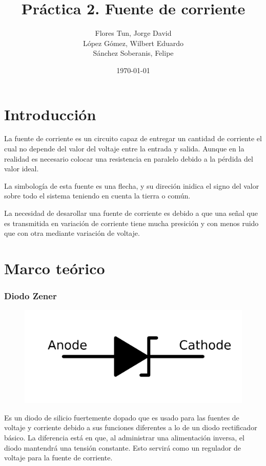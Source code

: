 \documentclass{article}
\title{Práctica 2. Fuente de corriente}
\author{Flores Tun, Jorge David\\ López Gómez, Wilbert Eduardo\\ Sánchez Soberanis, Felipe}
\date{\today}
\begin{document}
\maketitle

\tableofcontents

\section{Introducción}
La fuente de corriente es un circuito capaz de entregar un cantidad de corriente el cual no depende del valor del voltaje entre la entrada y salida. Aunque en la realidad es necesario colocar una resistencia en paralelo debido a la pérdida del valor ideal.

La simbología de esta fuente es una flecha, y su direción inidica el signo del valor sobre todo el sistema teniendo en cuenta la tierra o común.

La necesidad de desarollar una fuente de corriente es debido a que una señal que es transmitida en variación de corriente tiene mucha presición y con menos ruido que con otra mediante variación de voltaje.

\section{Marco teórico}
\subsubsection*{Diodo Zener}

\begin{figure}[h]
    \centering
    \includegraphics[scale=0.2]{1024px-Zener_diode_symbol.svg.png}    
\end{figure}


Es un diodo de silicio fuertemente dopado que es usado para las fuentes de voltaje y corriente debido a sus funciones 
diferentes a lo de un diodo rectificador básico. La diferencia está en que, al administrar una alimentación inversa, 
el diodo mantendrá una tensión constante. Esto servirá como un regulador de voltaje para la fuente de corriente.
\end{document}
